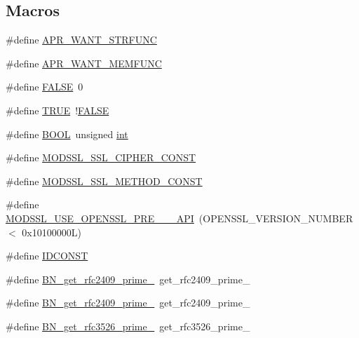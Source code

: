 \subsection*{Macros}
\begin{DoxyCompactItemize}
\item 
\#define \hyperlink{group__MOD__SSL__PRIVATE_ga88a4bf7f483aad3f3945773f3383e713}{A\+P\+R\+\_\+\+W\+A\+N\+T\+\_\+\+S\+T\+R\+F\+U\+NC}
\item 
\#define \hyperlink{group__MOD__SSL__PRIVATE_ga26faf43e3f61783d8b7aa928c0a41a11}{A\+P\+R\+\_\+\+W\+A\+N\+T\+\_\+\+M\+E\+M\+F\+U\+NC}
\item 
\#define \hyperlink{group__MOD__SSL__PRIVATE_gaa93f0eb578d23995850d61f7d61c55c1}{F\+A\+L\+SE}~0
\item 
\#define \hyperlink{group__MOD__SSL__PRIVATE_gaa8cecfc5c5c054d2875c03e77b7be15d}{T\+R\+UE}~!\hyperlink{pcregrep_8c_aa93f0eb578d23995850d61f7d61c55c1}{F\+A\+L\+SE}
\item 
\#define \hyperlink{group__MOD__SSL__PRIVATE_gae4cc35dcc70810fa972cc8a5185a28fa}{B\+O\+OL}~unsigned \hyperlink{pcre_8txt_a42dfa4ff673c82d8efe7144098fbc198}{int}
\item 
\#define \hyperlink{group__MOD__SSL__PRIVATE_ga7b6280feb97f6cd5c78fc4e8dd5b655a}{M\+O\+D\+S\+S\+L\+\_\+\+S\+S\+L\+\_\+\+C\+I\+P\+H\+E\+R\+\_\+\+C\+O\+N\+ST}
\item 
\#define \hyperlink{group__MOD__SSL__PRIVATE_ga76b4e09ab4f53af78ef366f667c9de01}{M\+O\+D\+S\+S\+L\+\_\+\+S\+S\+L\+\_\+\+M\+E\+T\+H\+O\+D\+\_\+\+C\+O\+N\+ST}
\item 
\#define \hyperlink{group__MOD__SSL__PRIVATE_gaab591417d0b8b2190c357d9be6ecad23}{M\+O\+D\+S\+S\+L\+\_\+\+U\+S\+E\+\_\+\+O\+P\+E\+N\+S\+S\+L\+\_\+\+P\+R\+E\+\_\+\_\+\_\+\+A\+PI}~(O\+P\+E\+N\+S\+S\+L\+\_\+\+V\+E\+R\+S\+I\+O\+N\+\_\+\+N\+U\+M\+B\+ER $<$ 0x10100000\+L)
\item 
\#define \hyperlink{group__MOD__SSL__PRIVATE_ga7b2aaacd57801ee8b4692b1699a1b1bd}{I\+D\+C\+O\+N\+ST}
\item 
\#define \hyperlink{group__MOD__SSL__PRIVATE_ga2132932d4439b834bc72a754e9005249}{B\+N\+\_\+get\+\_\+rfc2409\+\_\+prime\+\_}~get\+\_\+rfc2409\+\_\+prime\+\_
\item 
\#define \hyperlink{group__MOD__SSL__PRIVATE_ga671c7874b284d73da723a2ee57f17319}{B\+N\+\_\+get\+\_\+rfc2409\+\_\+prime\+\_}~get\+\_\+rfc2409\+\_\+prime\+\_
\item 
\#define \hyperlink{group__MOD__SSL__PRIVATE_ga03699bd564db4924309b79f14e469b5c}{B\+N\+\_\+get\+\_\+rfc3526\+\_\+prime\+\_}~get\+\_\+rfc3526\+\_\+prime\+\_

\end{DoxyCompactItemize}
